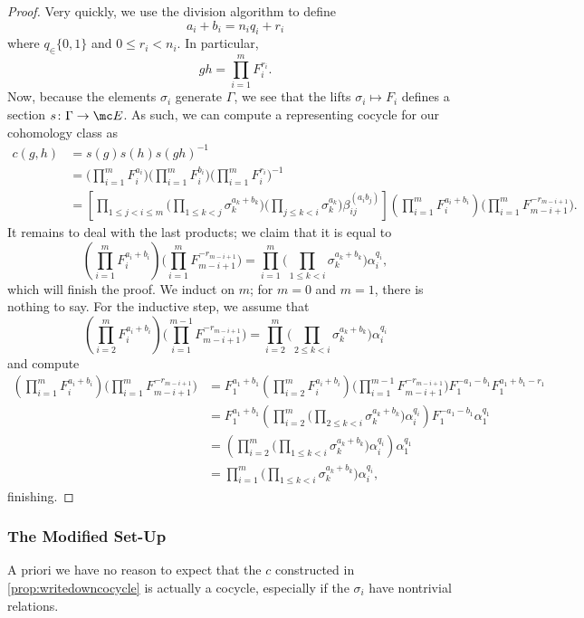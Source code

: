 \documentclass{article}
\numberwithin{equation}{section}
\begin{document}
\begin{proof}
	Very quickly, we use the division algorithm to define
	\[a_i+b_i=n_iq_i+r_i\]
	where $q_\in\{0,1\}$ and $0\le r_i<n_i$. In particular,
	\[gh=\prod_{i=1}^mF_i^{r_i}.\]
	Now, because the elements $\sigma_i$ generate $\Gamma$, we see that the lifts $\sigma_i\mapsto F_i$ defines a section $s\colon\Gamma\to\mc E$. As such, we can compute a representing cocycle for our cohomology class as
	\begin{align*}
		c(g,h) &= s(g)s(h)s(gh)^{-1} \\
		&= \Bigg(\prod_{i=1}^mF_i^{a_i}\Bigg)\Bigg(\prod_{i=1}^mF_i^{b_i}\Bigg)\Bigg(\prod_{i=1}^mF_i^{r_i}\Bigg)^{-1} \\
		&= \left[\prod_{1\le j<i\le m}\Bigg(\prod_{1\le k<j}\sigma_k^{a_k+b_k}\Bigg)\Bigg(\prod_{j\le k<i}\sigma_k^{a_k}\Bigg)\beta_{ij}^{(a_ib_j)}\right]\left(\prod_{i=1}^mF_i^{a_i+b_i}\right)\Bigg(\prod_{i=1}^mF_{m-i+1}^{-r_{m-i+1}}\Bigg).
	\end{align*}
	It remains to deal with the last products; we claim that it is equal to
	\[\left(\prod_{i=1}^mF_i^{a_i+b_i}\right)\Bigg(\prod_{i=1}^mF_{m-i+1}^{-r_{m-i+1}}\Bigg)=\prod_{i=1}^m\Bigg(\prod_{1\le k<i}\sigma_k^{a_k+b_k}\Bigg)\alpha_i^{q_i},\]
	which will finish the proof. We induct on $m$; for $m=0$ and $m=1$, there is nothing to say. For the inductive step, we assume that
	\[\left(\prod_{i=2}^mF_i^{a_i+b_i}\right)\Bigg(\prod_{i=1}^{m-1}F_{m-i+1}^{-r_{m-i+1}}\Bigg)=\prod_{i=2}^m\Bigg(\prod_{2\le k<i}\sigma_k^{a_k+b_k}\Bigg)\alpha_i^{q_i}\]
	and compute
	\begin{align*}
		\left(\prod_{i=1}^mF_i^{a_i+b_i}\right)\Bigg(\prod_{i=1}^mF_{m-i+1}^{-r_{m-i+1}}\Bigg) &= F_1^{a_1+b_1}\left(\prod_{i=2}^mF_i^{a_i+b_i}\right)\Bigg(\prod_{i=1}^{m-1}F_{m-i+1}^{-r_{m-i+1}}\Bigg)F_1^{-a_1-b_1}F_1^{a_1+b_1-r_1} \\
		&= F_1^{a_1+b_1}\left(\prod_{i=2}^m\Bigg(\prod_{2\le k<i}\sigma_k^{a_k+b_k}\Bigg)\alpha_i^{q_i}\right)F_1^{-a_1-b_1}\alpha_1^{q_1} \\
		&= \left(\prod_{i=2}^m\Bigg(\prod_{1\le k<i}\sigma_k^{a_k+b_k}\Bigg)\alpha_i^{q_i}\right)\alpha_1^{q_1} \\
		&= \prod_{i=1}^m\Bigg(\prod_{1\le k<i}\sigma_k^{a_k+b_k}\Bigg)\alpha_i^{q_i},
	\end{align*}
	finishing.
\end{proof}

\subsubsection{The Modified Set-Up}
A priori we have no reason to expect that the $c$ constructed in \autoref{prop:writedowncocycle} is actually a cocycle, especially if the $\sigma_i$ have nontrivial relations.
\end{document}
